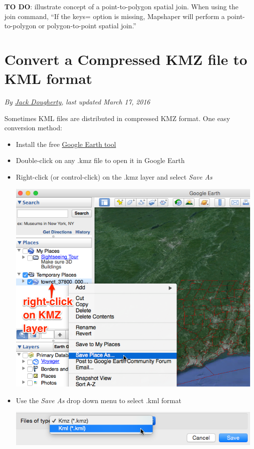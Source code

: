 \documentclass[
  english,
]{book}
\begin{document}
\textbf{TO DO}: illustrate concept of a point-to-polygon spatial join. When using the join command, ``If the keys= option is missing, Mapshaper will perform a point-to-polygon or polygon-to-point spatial join.''

\hypertarget{convert-kmz}{%
\section{Convert a Compressed KMZ file to KML format}\label{convert-kmz}}

\emph{By \href{author}{Jack Dougherty}, last updated March 17, 2016}

Sometimes KML files are distributed in compressed KMZ format. One easy conversion method:

\begin{itemize}
\item
  Install the free \href{https://www.google.com/earth/}{Google Earth tool}
\item
  Double-click on any .kmz file to open it in Google Earth
\item
  Right-click (or control-click) on the .kmz layer and select \emph{Save As}

  \includegraphics{images/09-transform/google-earth-convert-kmz.png}
\item
  Use the \emph{Save As} drop down menu to select .kml format

  \includegraphics{images/09-transform/google-earth-save-kml.png}
\end{itemize}
\end{document}
